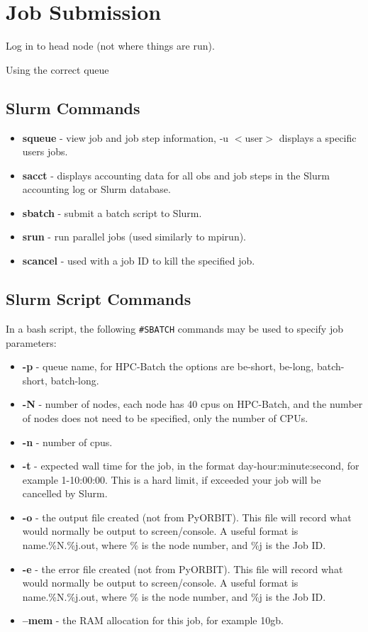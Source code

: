 \documentclass[a4paper]{cernatsnote}
\begin{document}
	\section{Job Submission}
	
	Log in to head node (not where things are run).
	
	Using the correct queue
	
	\subsection{Slurm Commands}
	
	\begin{itemize}
		\item{\textbf{squeue}} - view job and job step information, -u $<$user$>$ displays a specific users jobs.
		\item{\textbf{sacct}} - displays accounting data for all obs and job steps in the Slurm accounting log or Slurm database.
		\item{\textbf{sbatch}} - submit a batch script to Slurm.
		\item{\textbf{srun}} - run parallel jobs (used similarly to mpirun).
		\item{\textbf{scancel}} - used with a job ID to kill the specified job.
	\end{itemize}

	\subsection{Slurm Script Commands}
	
	In a bash script, the following \texttt{\#SBATCH} commands may be used to specify job parameters:
	
	\begin{itemize}
		\item{\textbf{-p}} - queue name, for HPC-Batch the options are be-short, be-long, batch-short, batch-long.
		\item{\textbf{-N}} - number of nodes, each node has 40 cpus on HPC-Batch, and the number of nodes does not need to be specified, only the number of CPUs.
		\item{\textbf{-n}} - number of cpus.
		\item{\textbf{-t}} - expected wall time for the job, in the format day-hour:minute:second, for example 1-10:00:00. This is a hard limit, if exceeded your job will be cancelled by Slurm.
		\item{\textbf{-o}} - the output file created (not from PyORBIT). This file will record what would normally be output to screen/console. A useful format is name.\%N.\%j.out, where \% is the node number, and \%j is the Job ID.
		\item{\textbf{-e}} - the error file created (not from PyORBIT). This file will record what would normally be output to screen/console. A useful format is name.\%N.\%j.out, where \% is the node number, and \%j is the Job ID.
		\item{\textbf{--mem}} - the RAM allocation for this job, for example 10gb.		
	\end{itemize}
\end{document}

